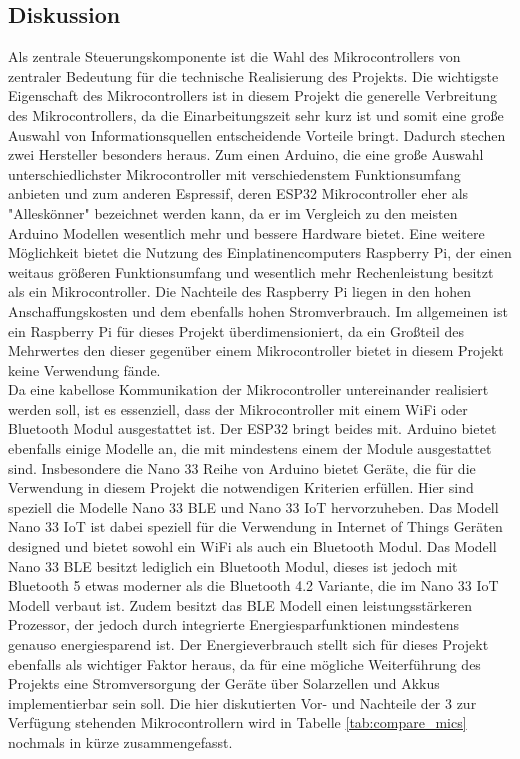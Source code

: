     \subsection{Diskussion}
        Als zentrale Steuerungskomponente ist die Wahl des Mikrocontrollers von zentraler Bedeutung für die technische Realisierung des Projekts. Die wichtigste Eigenschaft des Mikrocontrollers ist in diesem Projekt die generelle Verbreitung des Mikrocontrollers, da die Einarbeitungszeit sehr kurz ist und somit eine große Auswahl von Informationsquellen entscheidende Vorteile bringt. Dadurch stechen zwei Hersteller besonders heraus. Zum einen Arduino, die eine große Auswahl unterschiedlichster Mikrocontroller mit verschiedenstem Funktionsumfang anbieten und zum anderen Espressif, deren ESP32 Mikrocontroller eher als "Alleskönner" bezeichnet werden kann, da er im Vergleich zu den meisten Arduino Modellen wesentlich mehr und bessere Hardware bietet.
        Eine weitere Möglichkeit bietet die Nutzung des Einplatinencomputers Raspberry Pi, der einen weitaus größeren Funktionsumfang und wesentlich mehr Rechenleistung besitzt als ein Mikrocontroller. Die Nachteile des Raspberry Pi liegen in den hohen Anschaffungskosten und dem ebenfalls hohen Stromverbrauch. Im allgemeinen ist ein Raspberry Pi für dieses Projekt überdimensioniert, da ein Großteil des Mehrwertes den dieser gegenüber einem Mikrocontroller bietet in diesem Projekt keine Verwendung fände.\\
        
        Da eine kabellose Kommunikation der Mikrocontroller untereinander realisiert werden soll, ist es essenziell, dass der Mikrocontroller mit einem WiFi oder Bluetooth Modul ausgestattet ist. Der ESP32 bringt beides mit. Arduino bietet ebenfalls einige Modelle an, die mit mindestens einem der Module ausgestattet sind. Insbesondere die Nano 33 Reihe von Arduino bietet Geräte, die für die Verwendung in diesem Projekt die notwendigen Kriterien erfüllen. Hier sind speziell die Modelle Nano 33 BLE und Nano 33 IoT hervorzuheben. Das Modell Nano 33 IoT ist dabei speziell für die Verwendung in Internet of Things Geräten designed und bietet sowohl ein WiFi als auch ein Bluetooth Modul. Das Modell Nano 33 BLE besitzt lediglich ein Bluetooth Modul, dieses ist jedoch mit Bluetooth 5 etwas moderner als die Bluetooth 4.2 Variante, die im Nano 33 IoT Modell verbaut ist. Zudem besitzt das BLE Modell einen leistungsstärkeren Prozessor, der jedoch durch integrierte Energiesparfunktionen mindestens genauso energiesparend ist. Der Energieverbrauch stellt sich für dieses Projekt ebenfalls als wichtiger Faktor heraus, da für eine mögliche Weiterführung des Projekts eine Stromversorgung der Geräte über Solarzellen und Akkus implementierbar sein soll. Die hier diskutierten Vor- und Nachteile der 3 zur Verfügung stehenden Mikrocontrollern wird in Tabelle \ref{tab:compare_mics} nochmals in kürze zusammengefasst.

